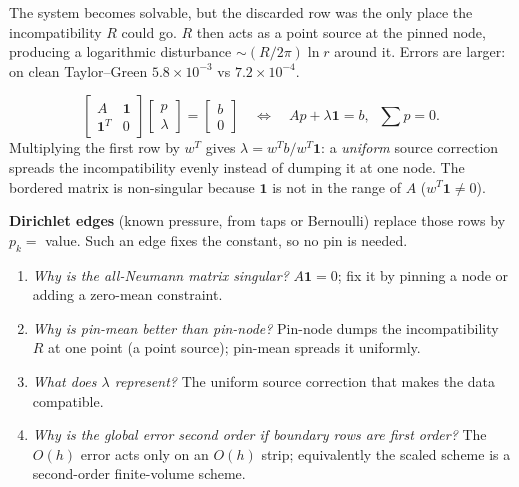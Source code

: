\begin{description}[style=nextline]
\item[\code{pin="node"}: replace one row by $p_k=0$]
The system becomes solvable, but the discarded row was the only place the incompatibility $R$ could go. $R$ then acts as a point source at the pinned node, producing a logarithmic disturbance $\sim(R/2\pi)\ln r$ around it. Errors are larger: on clean Taylor--Green $5.8\times10^{-3}$ vs $7.2\times10^{-4}$.
\item[\code{pin="mean"} (default): zero-mean augmented system]
\begin{equation}
\begin{bmatrix}A&\mathbf 1\\\mathbf 1^T&0\end{bmatrix}\begin{bmatrix}p\\\lambda\end{bmatrix}=\begin{bmatrix}b\\0\end{bmatrix}
\quad\Longleftrightarrow\quad Ap+\lambda\mathbf 1=b,\;\;\textstyle\sum p=0.
\end{equation}
Multiplying the first row by $w^T$ gives $\lambda=w^Tb/w^T\mathbf 1$: a \emph{uniform} source correction spreads the incompatibility evenly instead of dumping it at one node. The bordered matrix is non-singular because $\mathbf1$ is not in the range of $A$ ($w^T\mathbf 1\neq0$).
\end{description}

\textbf{Dirichlet edges} (known pressure, from taps or Bernoulli) replace those rows by $p_k=$ value. Such an edge fixes the constant, so no pin is needed.

\begin{viva}
\begin{enumerate}[leftmargin=*]
\item \emph{Why is the all-Neumann matrix singular?} $A\mathbf 1=0$; fix it by pinning a node or adding a zero-mean constraint.
\item \emph{Why is pin-mean better than pin-node?} Pin-node dumps the incompatibility $R$ at one point (a point source); pin-mean spreads it uniformly.
\item \emph{What does $\lambda$ represent?} The uniform source correction that makes the data compatible.
\item \emph{Why is the global error second order if boundary rows are first order?} The $O(h)$ error acts only on an $O(h)$ strip; equivalently the scaled scheme is a second-order finite-volume scheme.
\end{enumerate}
\end{viva}

